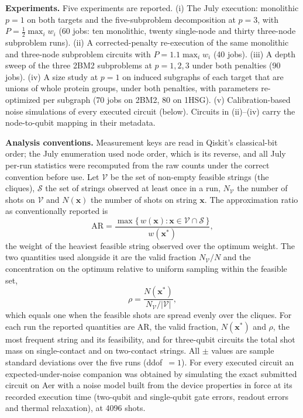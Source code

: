 \documentclass{iopjournal}
\newcommand{\AR}{\mathrm{AR}}
\begin{document}
\textbf{Experiments.} Five experiments are reported. (i) The July execution: monolithic $p=1$ on both targets and the five-subproblem decomposition at $p=3$, with $P = \tfrac{1}{2}\max_i w_i$ (60 jobs: ten monolithic, twenty single-node and thirty three-node subproblem runs). (ii) A corrected-penalty re-execution of the same monolithic and three-node subproblem circuits with $P = 1.1\max_i w_i$ (40 jobs). (iii) A depth sweep of the three 2BM2 subproblems at $p = 1, 2, 3$ under both penalties (90 jobs). (iv) A size study at $p=1$ on induced subgraphs of each target that are unions of whole protein groups, under both penalties, with parameters re-optimized per subgraph (70 jobs on 2BM2, 80 on 1HSG). (v) Calibration-based noise simulations of every executed circuit (below). Circuits in (ii)--(iv) carry the node-to-qubit mapping in their metadata.

\textbf{Analysis conventions.} Measurement keys are read in Qiskit's classical-bit order; the July enumeration used node order, which is its reverse, and all July per-run statistics were recomputed from the raw counts under the correct convention before use. Let $\mathcal{V}$ be the set of non-empty feasible strings (the cliques), $\mathcal{S}$ the set of strings observed at least once in a run, $N_{\mathcal{V}}$ the number of shots on $\mathcal{V}$ and $N(\mathbf{x})$ the number of shots on string $\mathbf{x}$. The approximation ratio as conventionally reported is
\begin{equation}
\label{eq:ar}
\AR = \frac{\max\{\, w(\mathbf{x}) : \mathbf{x} \in \mathcal{V}\cap\mathcal{S} \,\}}{w(\mathbf{x}^{\ast})},
\end{equation}
the weight of the heaviest feasible string observed over the optimum weight. The two quantities used alongside it are the valid fraction $N_{\mathcal{V}}/N$ and the concentration on the optimum relative to uniform sampling within the feasible set,
\begin{equation}
\label{eq:ratio}
\rho = \frac{N(\mathbf{x}^{\ast})}{N_{\mathcal{V}}/|\mathcal{V}|},
\end{equation}
which equals one when the feasible shots are spread evenly over the cliques. For each run the reported quantities are $\AR$, the valid fraction, $N(\mathbf{x}^{\ast})$ and $\rho$, the most frequent string and its feasibility, and for three-qubit circuits the total shot mass on single-contact and on two-contact strings. All $\pm$ values are sample standard deviations over the five runs (ddof~$=1$). For every executed circuit an expected-under-noise companion was obtained by simulating the exact submitted circuit on Aer with a noise model built from the device properties in force at its recorded execution time (two-qubit and single-qubit gate errors, readout errors and thermal relaxation), at 4096 shots.
\end{document}
